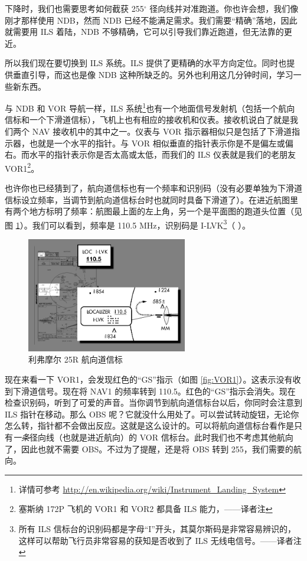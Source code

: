 下降时，我们也需要思考如何截获 255$^\circ$ 径向线并对准跑道。你也许会想，我们像刚才那样使用 NDB，然而 NDB 已经不能满足需求。我们需要“精确”落地，因此就需要用 ILS 着陆，NDB 不够精确，它可以引导我们靠近跑道，但无法靠的更近。

所以我们现在要切换到 ILS 系统。ILS 提供了更精确的水平方向定位。同时也提供垂直引导，而这也是像 NDB 这种所缺乏的。另外也利用这几分钟时间，学习一些新东西。

与 NDB 和 VOR 导航一样，ILS 系统\footnote{详情可参考 \url{http://en.wikipedia.org/wiki/Instrument_Landing_System}}也有一个地面信号发射机（包括一个航向信标和一个下滑道信标），飞机上也有相应的接收机和仪表。接收机说白了就是我们两个 NAV 接收机中的其中之一。仪表与 VOR 指示器相似只是包括了下滑道指示器，也就是一个水平的指针。与 VOR 相似垂直的指针表示你是不是偏左或偏右。而水平的指针表示你是否太高或太低，而我们的 ILS 仪表就是我们的老朋友 VOR1\footnote{塞斯纳 172P 飞机的 VOR1 和 VOR2 都具备 ILS 能力，——译者注}。

也许你也已经猜到了，航向道信标也有一个频率和识别码（没有必要单独为下滑道信标设立频率，当调节到航向道信标台时也就同时具备下滑道了）。在进近航图里有两个地方标明了频率：航图最上面的左上角，另一个是平面图的跑道头位置（见图 \ref{fig:localizer}）。我们可以看到，频率是 110.5 MHz，识别码是 I-LVK\footnote{所有 ILS 信标台的识别码都是字母“I”开头，其莫尔斯码是非常容易辨识的\mspace\mdot\mdot\mspace，这样可以帮助飞行员非常容易的获知是否收到了 ILS 无线电信号。——译者注}（\mdot\mdot\mspace \mdot\mdash\mdot\mdot\mspace
\mdot\mdot\mdot\mdash\mspace \mdash\mdot\mdash）。

\begin{figure}
  \begin{center}
    \includegraphics[width=7cm]{img/localizer}
    \caption{利弗摩尔 25R 航向道信标}
    \label{fig:localizer}
  \end{center}
\end{figure}

现在来看一下 VOR1，会发现红色的“GS”指示（如图 \ref{fig:VOR1}）。这表示没有收到下滑道信号。现在将 NAV1 的频率转到 110.5。红色的“GS”指示会消失。现在检查识别码，听到了可爱的声音。当你调节到航向道信标台以后，你同时会注意到 ILS 指针在移动。那么 OBS 呢？它就没什么用处了。可以尝试转动旋钮，无论你怎么转，指针都不会做出反应。这就是这么设计的。可以将航向道信标台看作是只有\emph{一条}径向线（也就是进近航向）的 VOR 信标台。此时我们也不考虑其他航向了，因此也就不需要 OBS。不过为了提醒，还是将 OBS 转到 255，我们需要的航向。

